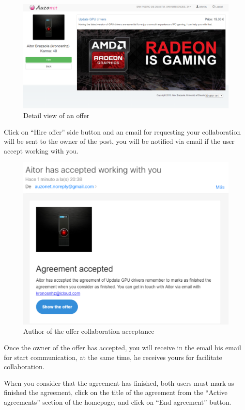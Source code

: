 \documentclass{DeustoFDP}
\begin{document}
\begin{figure}[h!]
\centering
\includegraphics[width=0.9\linewidth]{fig/Manual/detailoffer}
\caption[Detail view of an offer]{Detail view of an offer}
\label{fig:detailoffer}
\end{figure}


Click on “Hire offer” side button and an email for requesting your collaboration will be sent to the owner of the post, you will be notified via email if the user accept working with you.

\begin{figure}[h!]
\centering
\includegraphics[width=0.9\linewidth]{fig/Manual/ownerconfirmation}
\caption[Author of the offer collaboration acceptance]{Author of the offer collaboration acceptance}
\label{fig:ownerconfirmation}
\end{figure}


Once the owner of the offer has accepted, you will receive in the email his email for start communication, at the same time, he receives yours for facilitate collaboration.

When you consider that the agreement has finished, both users must mark as finished the agreement, click on the title of the agreement from the “Active agreements” section of the homepage, and click on “End agreement” button.
\end{document}
